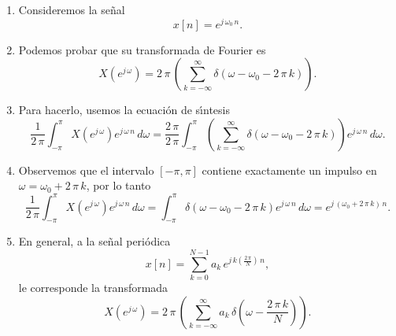 \begin{enumerate}

\item Consideremos la se\~{n}al 
\begin{equation}
  x\left[ n\right] =e^{j \, \omega_{0} \, n}.
\end{equation}

\item Podemos probar que su transformada de Fourier es 
\begin{equation}
  X\left( e^{j \, \omega }\right) =
  2 \, \pi \, \left( \sum_{k=-\infty }^{\infty }
    \delta \left(\omega -\omega _{0}-2 \, \pi \, k\right) \right).
\end{equation}

\item Para hacerlo, usemos la ecuaci\'{o}n de s\'{\i}ntesis 
\begin{equation}
\frac{1}{2 \, \pi }\int_{-\pi}^{\pi }
  X\left( e^{j \, \omega }\right) e^{j \, \omega \, n}\, d\omega =
  \frac{2 \, \pi}{2 \, \pi }\int_{-\pi}^{\pi}
    \left(
      \sum_{k=-\infty}^{\infty } \delta \left( \omega -\omega _{0}-2 \, \pi \, k \right) 
    \right)
    e^{j \, \omega \, n}\, d\omega .
\end{equation}

\item Observemos que el intervalo $\left[-\pi, \pi\right] $ contiene exactamente un
impulso en $\omega = \omega_{0} + 2 \, \pi \, k$, por lo tanto 
\begin{equation}
\frac{1}{2 \, \pi }\int_{-\pi}^{\pi }X\left( e^{j \, \omega }\right) e^{j \, \omega \, n}\, d\omega =
  \int_{-\pi}^{\pi }\delta \left( \omega -\omega _{0} - 2 \, \pi \, k\right)e^{j \, \omega \, n}\, d\omega =
  e^{j \, \left(\omega_{0} + 2 \, \pi \, k\right) \, n}.
\end{equation}

\item En general, a la se\~{n}al peri\'{o}dica 
\begin{equation}
x\left[ n\right] =\sum_{k=0}^{N-1}a_{k} \, e^{j \, k\left( \frac{2 \, \pi }{N}\right) \, n},
\end{equation}
le corresponde la transformada
\begin{equation}
X\left( e^{j \, \omega }\right) =
2 \, \pi \, \left(\sum_{k=-\infty }^{\infty } a_{k} \, \delta\left( \omega -\frac{2 \, \pi \, k}{N}\right)\right). 
\label{tfdperiodica}
\end{equation}


\end{enumerate}

